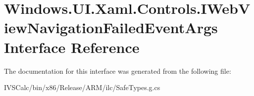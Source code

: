 \hypertarget{interface_windows_1_1_u_i_1_1_xaml_1_1_controls_1_1_i_web_view_navigation_failed_event_args}{}\section{Windows.\+U\+I.\+Xaml.\+Controls.\+I\+Web\+View\+Navigation\+Failed\+Event\+Args Interface Reference}
\label{interface_windows_1_1_u_i_1_1_xaml_1_1_controls_1_1_i_web_view_navigation_failed_event_args}


The documentation for this interface was generated from the following file\+:\begin{DoxyCompactItemize}
\item 
I\+V\+S\+Calc/bin/x86/\+Release/\+A\+R\+M/ilc/Safe\+Types.\+g.\+cs\end{DoxyCompactItemize}
